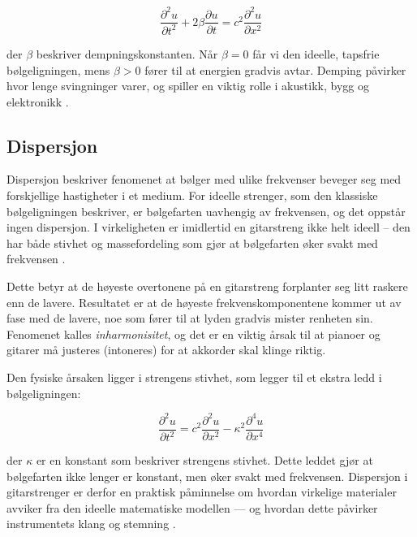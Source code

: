 \begin{equation*}
\frac{\partial^2 u}{\partial t^2} + 2\beta \frac{\partial u}{\partial t} = c^2 \frac{\partial^2 u}{\partial x^2}
\end{equation*}

der $\beta$ beskriver dempningskonstanten.  
Når $\beta = 0$ får vi den ideelle, tapsfrie bølgeligningen, mens $\beta > 0$ fører til at energien gradvis avtar.  
Demping påvirker hvor lenge svingninger varer, og spiller en viktig rolle i akustikk, bygg og elektronikk \parencite{libretextsDamping}.

\subsection{Dispersjon}

Dispersjon beskriver fenomenet at bølger med ulike frekvenser beveger seg med forskjellige hastigheter i et medium.  
For ideelle strenger, som den klassiske bølgeligningen beskriver, er bølgefarten uavhengig av frekvensen, og det oppstår ingen dispersjon.  
I virkeligheten er imidlertid en gitarstreng ikke helt ideell – den har både stivhet og massefordeling som gjør at bølgefarten øker svakt med frekvensen \parencite{kartofelev2019dispersive}.  

Dette betyr at de høyeste overtonene på en gitarstreng forplanter seg litt raskere enn de lavere.  
Resultatet er at de høyeste frekvenskomponentene kommer ut av fase med de lavere, noe som fører til at lyden gradvis mister renheten sin.  
Fenomenet kalles \textit{inharmonisitet}, og det er en viktig årsak til at pianoer og gitarer må justeres (intoneres) for at akkorder skal klinge riktig.  

Den fysiske årsaken ligger i strengens stivhet, som legger til et ekstra ledd i bølgeligningen:  

\begin{equation*}
\frac{\partial^2 u}{\partial t^2} = c^2 \frac{\partial^2 u}{\partial x^2} - \kappa^2 \frac{\partial^4 u}{\partial x^4}
\end{equation*}

der $\kappa$ er en konstant som beskriver strengens stivhet.  
Dette leddet gjør at bølgefarten ikke lenger er konstant, men øker svakt med frekvensen.  
Dispersjon i gitarstrenger er derfor en praktisk påminnelse om hvordan virkelige materialer avviker fra den ideelle matematiske modellen — og hvordan dette påvirker instrumentets klang og stemning \parencite{kartofelev2019dispersive, unswStringsHarmonics, wikipediaInharmonicity}.

